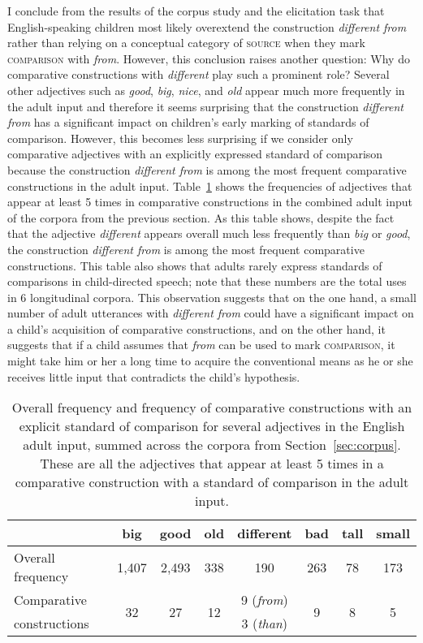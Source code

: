 \documentclass[lucida]{sp} %
\begin{document}
I conclude from the results of the corpus study and the elicitation task that English-speaking children most likely overextend the construction \textit{different from} rather than relying on a conceptual category of \textsc{source} when they mark \textsc{comparison} with \textit{from}. However, this conclusion raises another question: Why do comparative constructions with \textit{different} play such a prominent role?  Several other adjectives such as \textit{good}, \textit{big}, \textit{nice}, and \textit{old} appear much more frequently in the adult input and therefore it seems surprising that the construction \textit{different from} has a significant impact on children's early marking of standards of comparison. However, this becomes less surprising if we consider only comparative adjectives with an explicitly expressed standard of comparison because the construction \textit{different from} is among the most frequent comparative constructions in the adult input. Table~\ref{tbl:adjectives} shows the frequencies of adjectives that appear at least 5 times in comparative constructions in the combined adult input of the corpora from the previous section. As this table shows, despite the fact that the adjective \textit{different} appears overall much less frequently than \textit{big} or \textit{good},  the construction \textit{different from} is  among the most frequent comparative constructions. This table also shows that adults rarely express standards of comparisons in child-directed speech; note that these numbers are the total uses in 6 longitudinal corpora. This observation suggests that on the one hand, a small number of adult utterances with \textit{different from} could have a significant impact on a child's acquisition of comparative constructions, and on the other hand, it suggests that if a child assumes that \textit{from} can be used to mark \textsc{comparison}, it might take him or her a long time to acquire the conventional means as he or she receives little input that contradicts the child's hypothesis.

\begin{table}
\begin{tabularx}{\textwidth}{l | c  | c | c |  c  | c | c | c  }
 & big & good & old & different & bad & tall & small \\ \midrule
Overall frequency & 1,407 & 2,493 & 338 & 190 & 263 & 78 & 173 \\ \hline
Comparative  & \multirow{2}{*}{32} & \multirow{2}{*}{27} & \multirow{2}{*}{12} & 9 (\textit{from})& \multirow{2}{*}{9} & \multirow{2}{*}{8} & \multirow{2}{*}{5}  \\
constructions &      &      &      &   3 (\textit{than})  & & &  \\
\end{tabularx}
\caption{Overall frequency and frequency of comparative constructions with an explicit standard of comparison for several adjectives in the English adult input, summed across the corpora from Section~\ref{sec:corpus}.  These are all the adjectives that appear at least 5 times in a comparative construction with a standard of comparison in the adult input.}\label{tbl:adjectives}
\end{table}
\end{document}
